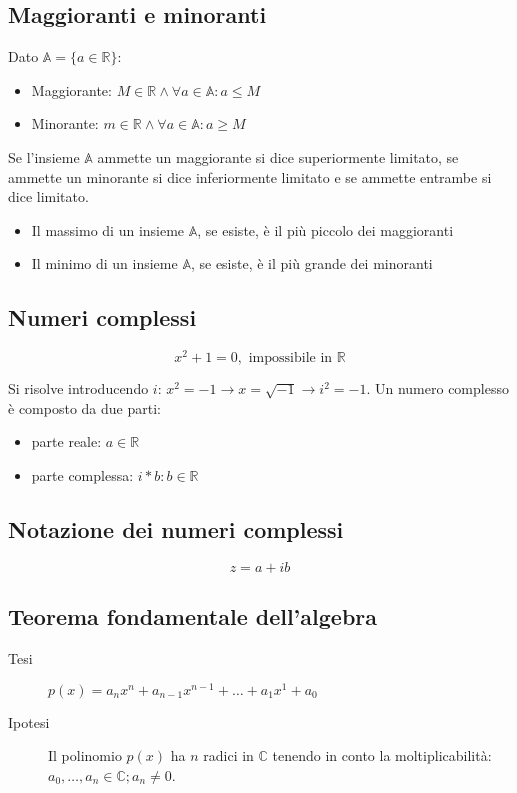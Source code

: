 \documentclass{article}
\begin{document}
\subsection{Maggioranti e minoranti}

Dato $\mathbb{A} = \{ a \in \mathbb{R} \}$:

\begin{itemize}
    \item Maggiorante: $M \in \mathbb{R} \land \forall a \in \mathbb{A} : a \leq M$
    \item Minorante: $m \in \mathbb{R} \land \forall a \in \mathbb{A} : a \geq M$
\end{itemize}

\noindent
Se l'insieme $\mathbb{A}$ ammette un maggiorante si dice superiormente limitato, se ammette un minorante si dice inferiormente limitato e se ammette entrambe si dice limitato.

\begin{itemize}
    \item Il massimo di un insieme $\mathbb{A}$, se esiste, è il più piccolo dei maggioranti
    \item Il minimo di un insieme $\mathbb{A}$, se esiste, è il più grande dei minoranti
\end{itemize}

\subsection{Numeri complessi}

$$
x^2 + 1 = 0, \text{ impossibile in } \mathbb{R}
$$

\noindent
Si risolve introducendo $i$: $x^2 = -1 \to x = \sqrt{-1} \to i^2 = -1$.
Un numero complesso è composto da due parti:

\begin{itemize}
    \item parte reale: $a \in \mathbb{R}$
    \item parte complessa: $i * b : b \in \mathbb{R}$
\end{itemize}

\subsection{Notazione dei numeri complessi}

$$
z = a + ib
$$

\subsection{Teorema fondamentale dell'algebra}

\begin{description}
    \item[Tesi] $p(x) = a_n x^n + a_{n-1} x^{n-1} + \dots + a_1 x^1 + a_0$
    \item[Ipotesi] Il polinomio $p(x)$ ha $n$ radici in $\mathbb{C}$ tenendo in conto la moltiplicabilità: $a_0, \dots , a_n \in \mathbb{C}; a_n \neq 0$.
\end{description}
\end{document}
